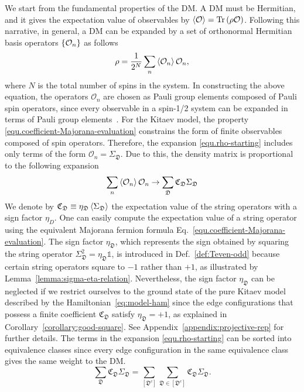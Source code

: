 We start from the fundamental properties of the DM. A DM must be Hermitian, and it gives the expectation value of observables by $\left\langle \mathcal{O} \right\rangle = \Tr\left( \rho \mathcal{O} \right)$. {Following this narrative, in general, a DM can be expanded by a set of orthonormal Hermitian basis operators $\left\{ \mathcal{O}_n \right\}$ as follows}
\begin{equation}\label{equ.rho-starting}
    \rho = \frac{1}{2^N}\sum_{n}\left\langle \mathcal{O}_n \right\rangle\mathcal{O}_n,
\end{equation}
{where $N$ is the total number of spins in the system.} {In constructing the above equation, the operators $\mathcal{O}_n$ are chosen as Pauli group elements composed of Pauli spin operators, since every observable in a spin-1/2 system can be expanded in terms of Pauli group elements~\cite{Nielsen-Chuang_2010}. } For the Kitaev model, the property \eqref{equ.coefficient-Majorana-evaluation} constrains the form of finite observables composed of spin operators. Therefore, the expansion \eqref{equ.rho-starting} includes only terms of the form $\mathcal{O}_n = \Sigma_\mathfrak{D}$. Due to this, the density matrix is proportional to the following expansion
\[
\sum_{n} \left\langle \mathcal{O}_n \right\rangle\mathcal{O}_n
\to
\sum_{\mathfrak{D}} \mathfrak{C}_{\mathfrak{D}}\Sigma_\mathfrak{D}
\]
{We denote by $\mathfrak{C}_{\mathfrak{D}} \equiv \eta_{\mathfrak{D}}\left\langle \Sigma_\mathfrak{D} \right\rangle$ the expectation value of the string operators with a sign factor $\eta_D$. One can easily compute the expectation value of a string operator using the equivalent Majorana fermion formula Eq.~\eqref{equ.coefficient-Majorana-evaluation}. The sign factor $\eta_\mathfrak{D}$, which represents the sign obtained by squaring the string operator $\Sigma_\mathfrak{D}^2 = \eta_\mathfrak{D}\mathds{1}$, is introduced in Def.~\ref{def:Teven-odd} because certain string operators square to $-1$ rather than $+1$, as illustrated by Lemma~\ref{lemma:sigma-eta-relation}. Nevertheless, the sign factor $\eta_\mathfrak{D}$ can be neglected if we restrict ourselves to the ground state of the pure Kitaev model described by the Hamiltonian~\eqref{eq:model-ham} since the edge configurations that possess a finite coefficient $\mathfrak{C}_\mathfrak{D}$ satisfy $\eta_\mathfrak{D} = +1$, as explained in Corollary~\ref{corollary:good-square}. See Appendix~\ref{appendix:projective-rep} for further details.} 
%
The terms in the expansion \eqref{equ.rho-starting} can be sorted into equivalence classes since every edge configuration in the same equivalence class gives the same weight to the DM.
\begin{equation}\label{equ.class-sum}
    \sum_{\mathfrak{D}}\mathfrak{C}_{\mathfrak{D}}\Sigma_\mathfrak{D} = \sum_{[\mathfrak{D}^c]}\sum_{\mathfrak{D}\in[\mathfrak{D}^c]}\mathfrak{C}_{\mathfrak{D}}\Sigma_\mathfrak{D}.
\end{equation}
